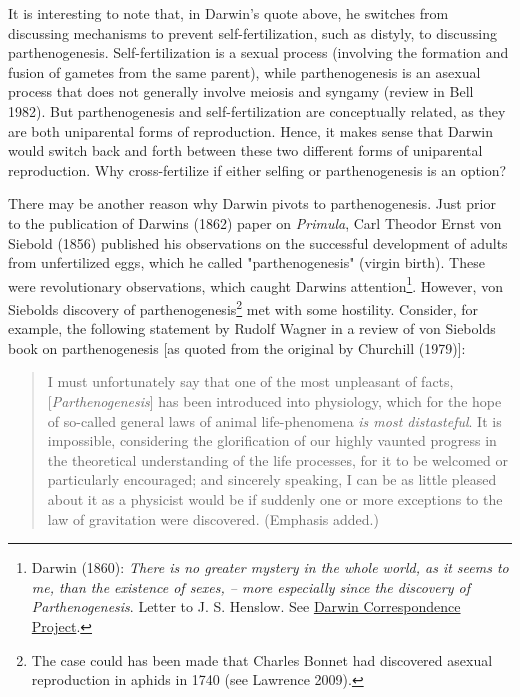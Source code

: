 \documentclass[
  letterpaper,
]{scrbook}
\begin{document}
It is interesting to note that, in Darwin's quote above, he switches
from discussing mechanisms to prevent self-fertilization, such as
distyly, to discussing parthenogenesis. Self-fertilization is a sexual
process (involving the formation and fusion of gametes from the same
parent), while parthenogenesis is an asexual process that does not
generally involve meiosis and syngamy (review in Bell 1982). But
parthenogenesis and self-fertilization are conceptually related, as they
are both uniparental forms of reproduction. Hence, it makes sense that
Darwin would switch back and forth between these two different forms of
uniparental reproduction. Why cross-fertilize if either selfing or
parthenogenesis is an option?

There may be another reason why Darwin pivots to parthenogenesis. Just
prior to the publication of Darwin\textquotesingle s (1862) paper on
\emph{Primula}, Carl Theodor Ernst von Siebold (1856) published his
observations on the successful development of adults from unfertilized
eggs, which he called "parthenogenesis" (virgin birth). These were
revolutionary observations, which caught Darwin\textquotesingle s
attention\footnote{Darwin (1860): \emph{There is no greater mystery in
  the whole world, as it seems to me, than the existence of sexes, --
  more especially since the discovery of Parthenogenesis}. Letter to J.
  S. Henslow. See
  \href{https://www.darwinproject.ac.uk/letter/DCP-LETT-2860.xml}{Darwin
  Correspondence Project}.}. However, von Siebold\textquotesingle s
discovery of parthenogenesis\footnote{The case could has been made that
  Charles Bonnet had discovered asexual reproduction in aphids in 1740
  (see Lawrence 2009).} met with some hostility. Consider, for example,
the following statement by Rudolf Wagner in a review of von
Siebold\textquotesingle s book on parthenogenesis {[}as quoted from the
original by Churchill (1979){]}:

\begin{quote}
I must unfortunately say that one of the most unpleasant of facts,
{[}\emph{Parthenogenesis}{]} has been introduced into physiology, which
for the hope of so-called general laws of animal life-phenomena \emph{is
most distasteful}. It is impossible, considering the glorification of
our highly vaunted progress in the theoretical understanding of the life
processes, for it to be welcomed or particularly encouraged; and
sincerely speaking, I can be as little pleased about it as a physicist
would be if suddenly one or more exceptions to the law of gravitation
were discovered. (Emphasis added.)
\end{quote}
\end{document}
